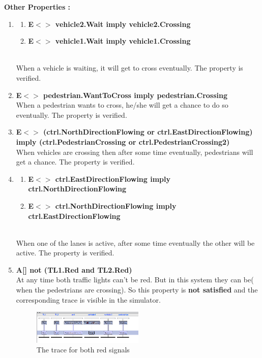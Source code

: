 \documentclass[conference]{IEEEtran}
\begin{document}
\noindent \textbf{Other Properties :}
\\
\begin{enumerate}
    \item 
    \begin{enumerate}
    \item \textbf{E$<>$ vehicle2.Wait imply vehicle2.Crossing}
    \item \textbf{E$<>$ vehicle1.Wait imply vehicle1.Crossing}
    \end{enumerate}
    \\
    When a vehicle is waiting, it will get to cross eventually. The property is verified.
    \\
    \item \textbf{E$<>$ pedestrian.WantToCross imply pedestrian.Crossing}
    \\
    When a pedestrian wants to cross, he/she will get a chance to do so eventually. The property is verified.
    \\
    \item \textbf{E$<>$ (ctrl.NorthDirectionFlowing or ctrl.EastDirectionFlowing) imply (ctrl.PedestrianCrossing or ctrl.PedestrianCrossing2)}
    \\
    When vehicles are crossing then after some time eventually, pedestrians will get a chance. The property is verified.
    \\
    \item 
    \begin{enumerate}
        \item \textbf{E$<>$ ctrl.EastDirectionFlowing imply ctrl.NorthDirectionFlowing}
        \item \textbf{E$<>$ ctrl.NorthDirectionFlowing imply ctrl.EastDirectionFlowing}
    \end{enumerate}
    \\
    When one of the lanes is active, after some time eventually the other will be active. The property is verified.
    \\
    \item \textbf{A[] not (TL1.Red and TL2.Red)}
    \\
    At any time both traffic lights can't be red. But in this system they can be( when the pedestrians are crossing). So this property is \textbf{not satisfied} and the corresponding trace is visible in the simulator.
    \\
    \begin{figure}[h]
        \centering
        \includegraphics[width=0.5\textwidth]{Fig 10.png}
        \caption{The trace for both red signals}
    \end{figure}
\end{enumerate}
\end{document}

